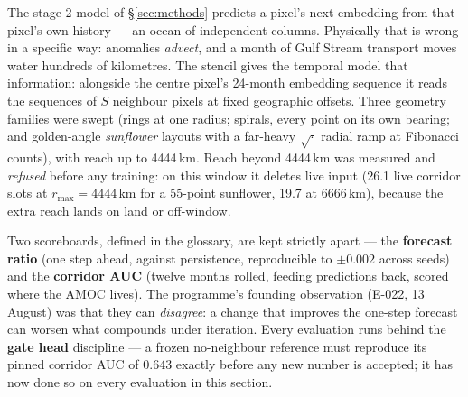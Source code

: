 \documentclass[10pt]{article}
\newcommand{\term}[1]{\textbf{#1}}
\begin{document}
The stage-2 model of \S\ref{sec:methods} predicts a pixel's next
embedding from that pixel's own history --- an ocean of independent
columns. Physically that is wrong in a specific way: anomalies
\emph{advect}, and a month of Gulf Stream transport moves water hundreds
of kilometres. The stencil gives the temporal model that information:
alongside the centre pixel's 24-month embedding sequence it reads the
sequences of $S$ neighbour pixels at fixed geographic offsets. Three
geometry families were swept (rings at one radius; spirals, every point
on its own bearing; and golden-angle \emph{sunflower} layouts with a
far-heavy $\sqrt{\cdot}$ radial ramp at Fibonacci counts), with reach up
to 4444\,km. Reach beyond 4444\,km was measured and \emph{refused}
before any training: on this window it deletes live input (26.1 live
corridor slots at $r_{\max}{=}4444$\,km for a 55-point sunflower, 19.7
at 6666\,km), because the extra reach lands on land or off-window.

Two scoreboards, defined in the glossary, are kept strictly apart ---
the \term{forecast ratio} (one step ahead, against persistence,
reproducible to $\pm0.002$ across seeds) and the \term{corridor AUC}
(twelve months rolled, feeding predictions back, scored where the AMOC
lives). The programme's founding observation (E-022, 13 August) was
that they can \emph{disagree}: a change that improves the one-step
forecast can worsen what compounds under iteration. Every evaluation
runs behind the \term{gate head} discipline --- a frozen no-neighbour
reference must reproduce its pinned corridor AUC of $0.643$ exactly
before any new number is accepted; it has now done so on every
evaluation in this section.
\end{document}
